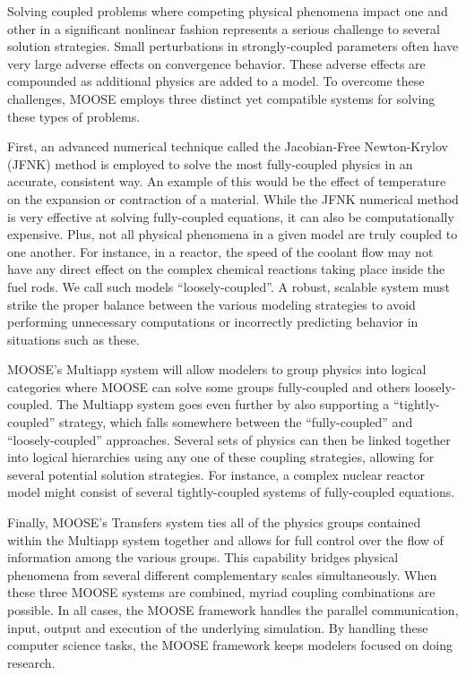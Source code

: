 \documentclass{INLreport}
\begin{document}
Solving coupled problems where competing physical phenomena impact one and other in a significant nonlinear fashion represents a
serious challenge to
several solution strategies. Small perturbations in strongly-coupled parameters often have very large adverse effects on
convergence behavior. These adverse effects are compounded as additional physics are added to a model. To overcome these
challenges, MOOSE employs three distinct yet compatible systems for solving these types of problems.

First, an advanced numerical technique called the Jacobian-Free Newton-Krylov (JFNK) method is employed to solve the most fully-coupled physics
in an accurate, consistent way. An example of this would be the effect of temperature on the expansion or contraction of a
material. While the JFNK numerical method is very effective at solving fully-coupled equations, it can also be computationally
expensive. Plus, not all physical phenomena in a given model are truly coupled to one another. For instance, in a reactor, the
speed of the coolant flow may not have any direct effect on the complex chemical reactions taking place inside the fuel rods.
We call such models ``loosely-coupled''. A robust, scalable system must strike the proper balance between the various modeling
strategies to avoid performing unnecessary computations or incorrectly predicting behavior in situations such as these.

MOOSE’s Multiapp system will allow modelers to group physics into logical categories where MOOSE can solve some groups
fully-coupled and others loosely-coupled. The Multiapp system goes even further by also supporting a “tightly-coupled”
strategy, which falls somewhere between the “fully-coupled” and “loosely-coupled” approaches. Several sets of physics can then
be linked together into logical hierarchies using any one of these coupling strategies, allowing for several potential solution
strategies. For instance, a complex nuclear reactor model might consist of several tightly-coupled systems of fully-coupled
equations.

Finally, MOOSE’s Transfers system ties all of the physics groups contained within the Multiapp system together and allows for
full control over the flow of information among the various groups. This capability bridges physical phenomena from several
different complementary scales simultaneously. When these three MOOSE systems are combined, myriad coupling combinations are
possible. In all cases, the MOOSE framework handles the parallel communication, input, output and execution of the underlying
simulation. By handling these computer science tasks, the MOOSE framework keeps modelers focused on doing research.
\end{document}
